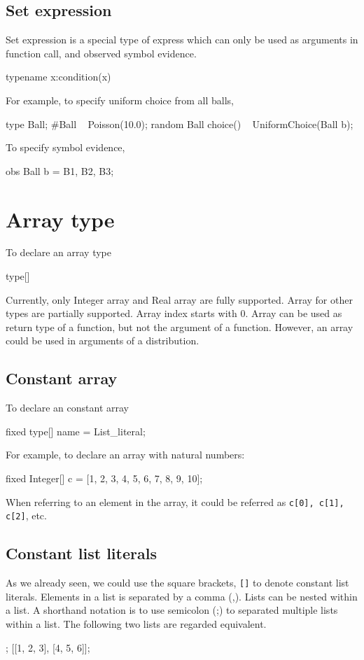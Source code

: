 \documentclass[12pt]{article}
\begin{document}
\subsection{Set expression}
Set expression is a special type of express which can only be used as arguments in function call, and observed symbol evidence. 
\begin{blogcode}
{typename x:condition(x)}
\end{blogcode}

For example, to specify uniform choice from all balls,
\begin{blogcode}
type Ball;
#Ball ~ Poisson(10.0);
random Ball choice() ~ UniformChoice({Ball b});
\end{blogcode}

To specify symbol evidence,
\begin{blogcode}
obs {Ball b} = {B1, B2, B3};
\end{blogcode}

\section{Array type}
To declare an array type
\begin{blogcode}
type[]
\end{blogcode}

Currently, only Integer array and Real array are fully supported. Array for other types are partially supported. Array index starts with 0. Array can be used as return type of a function, but not the argument of a function. However, an array could be used in arguments of a distribution. 

\subsection{Constant array}
To declare an constant array
\begin{blogcode}
fixed type[] name = List_literal;
\end{blogcode}

For example, to declare an array with natural numbers:
\begin{blogcode}
fixed Integer[] c = [1, 2, 3, 4, 5, 6, 7, 8, 9, 10];
\end{blogcode}

When referring to an element in the array, it could be referred as \verb|c[0], c[1], c[2]|, etc.

\subsection{Constant list literals}
As we already seen, we could use the square brackets, \texttt{[]} to denote constant list literals.
Elements in a list is separated by a comma (,). Lists can be nested within a list. A shorthand notation is to use semicolon (;) to separated multiple lists within a list.
The following two lists are regarded equivalent.
\begin{blogcode}
[1, 2, 3; 4, 5, 6];
[[1, 2, 3], [4, 5, 6]];
\end{blogcode}
\end{document}
